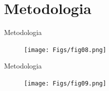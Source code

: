 \documentclass{CPSPresentation}
\begin{document}
%	
%	
%	
%	
%	
%	
%	
%	
%	
%	
%	
%	
%	
%	
%	
\section{Metodologia}
\begin{frame}{Metodologia}
	\justifying
	
	\begin{figure}[h]
		\centering
		\texttt{[image: Figs/fig08.png]}
	\end{figure}
	
	
\end{frame}
\begin{frame}{Metodologia}
	\justifying
	
	\begin{figure}[h]
		\centering
		\texttt{[image: Figs/fig09.png]}
	\end{figure}
	
	
\end{frame}
\end{document}
